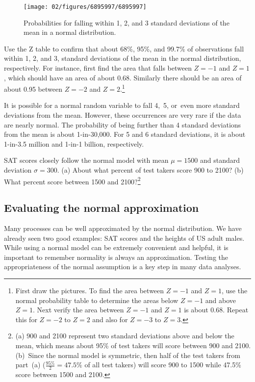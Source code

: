 \begin{figure}[hht]
\centering
\texttt{[image: 02/figures/6895997/6895997]}
\caption{Probabilities for falling within 1, 2, and 3 standard deviations of the mean in a normal distribution.}
\label{6895997}
\end{figure}

\begin{exercise}
Use the Z table to confirm that about 68\%, 95\%, and 99.7\% of observations fall within 1, 2, and 3, standard deviations of the mean in the normal distribution, respectively. For instance, first find the area that falls between $Z=-1$ and $Z=1$, which should have an area of about 0.68. Similarly there should be an area of about 0.95 between $Z=-2$ and $Z=2$.\footnote{First draw the pictures. To find the area between $Z=-1$ and $Z=1$, use the normal probability table to determine the areas below $Z=-1$ and above $Z=1$. Next verify the area between $Z=-1$ and $Z=1$ is about 0.68. Repeat this for $Z=-2$ to $Z=2$ and also for $Z=-3$ to $Z=3$.}
\end{exercise}

It is possible for a normal random variable to fall 4,~5, or~even more standard deviations from the mean. However, these occurrences are very rare if the data are nearly normal. The probability of being further than 4 standard deviations from the mean is about 1-in-30,000. For 5 and 6 standard deviations, it is about 1-in-3.5 million and 1-in-1 billion, respectively.

\begin{exercise}
SAT scores closely follow the normal model with mean $\mu = 1500$ and standard deviation $\sigma = 300$. (a) About what percent of test takers score 900 to 2100? (b) What percent score between 1500 and 2100?\footnote{(a) 900 and 2100 represent two standard deviations above and below the mean, which means about 95\% of test takers will score between 900 and 2100. (b)~Since the normal model is symmetric, then half of the test takers from part~(a) ($\frac{95\%}{2} = 47.5\%$ of all test takers) will score 900 to 1500 while 47.5\% score between 1500 and 2100.}
\end{exercise}


\subsection{Evaluating the normal approximation}
\label{assessingNormal}

Many processes can be well approximated by the normal distribution. We have already seen two good examples: SAT scores and the heights of US adult males. While using a normal model can be extremely convenient and helpful, it is important to remember normality is always an approximation. Testing the appropriateness of the normal assumption is a key step in many data analyses.

